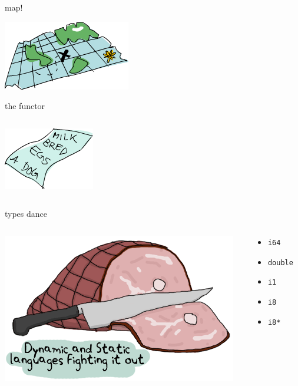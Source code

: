 \documentclass{beamer}
\begin{document}
\begin{frame}{map!}
  \begin{center}\includegraphics[scale=0.6]{map}\end{center}
  \vfill
  
\end{frame}

\begin{frame}{the functor}
  \begin{columns}
    \begin{column}[b]{5.5cm}
      \includegraphics[scale=0.6]{list}
    \end{column}
    \begin{column}[b]{4.5cm}
      
    \end{column}
  \end{columns}
\end{frame}

\begin{frame}{types dance}
  \begin{columns}
    \begin{column}[b]{5.5cm}
      \includegraphics[scale=0.4]{dynamic-static-types}
    \end{column}
    \begin{column}[b]{4.5cm}
      \begin{itemize}
      \item[] \texttt{i64}
      \item[] \texttt{double}
      \item[] \texttt{i1}
      \item[] \texttt{i8}
      \item[] \texttt{i8*}
      \end{itemize}
    \end{column}
  \end{columns}
\end{frame}
\end{document}
